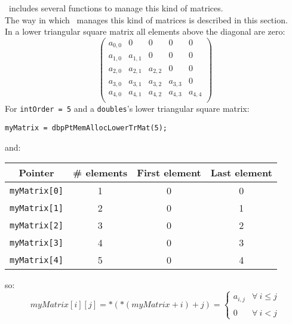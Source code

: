 \BI \ includes several functions to manage this kind of matrices.\\

The way in which \BI \ manages this kind of matrices is described in this section.\\

In a lower triangular square matrix all elements above the diagonal are zero: 
%
\begin{displaymath}
\left( \begin{array}{ccccc}
  a_{0,0} & 0      & 0      & 0      & 0 \\
  a_{1,0} & a_{1,1} & 0      & 0      & 0 \\ 
  a_{2,0} & a_{2,1} & a_{2,2} & 0      & 0 \\
  a_{3,0} & a_{3,1} & a_{3,2} & a_{3,3} & 0 \\
  a_{4,0} & a_{4,1} & a_{4,2} & a_{4,3} & a_{4,4} \\
\end{array} \right)
\end{displaymath}
%
For \texttt{intOrder = 5} and a \texttt{doubles}'s lower triangular square matrix:
%
\begin{verbatim}
myMatrix = dbpPtMemAllocLowerTrMat(5);  
\end{verbatim}
%
and:
\begin{center}
  \begin{tabular}{|c|c|c|c|}
    \hline
    \textbf{Pointer} & \textbf{\# elements} & \textbf{First element} & \textbf{Last element}\\
    \hline
    \texttt{myMatrix[0]} & 1 & 0 & 0\\
    \hline
    \texttt{myMatrix[1]} & 2 & 0 & 1\\
    \hline
    \texttt{myMatrix[2]} & 3 & 0 & 2\\
    \hline
    \texttt{myMatrix[3]} & 4 & 0 & 3\\
    \hline
    \texttt{myMatrix[4]} & 5 & 0 & 4\\
    \hline
  \end{tabular}
\end{center}
%
so:
%
\begin{displaymath}
  myMatrix[i][j] = *(*(myMatrix + i) + j) = \left\{ \begin{array}{ll}
    a_{i,j} & \forall \ i \le j \\
     & \\
    0 & \forall \ i < j
    \end{array} \right.    
\end{displaymath}

